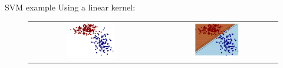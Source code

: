 \begin{frame}{SVM example}
Using a linear kernel:
\begin{figure}
\begin{tabular}{cc}
\includegraphics[width=0.4\textwidth]{img/svm/linear_kernel_11.pdf}&
\includegraphics[width=0.4\textwidth]{img/svm/linear_kernel_12.pdf}
\end{tabular}
\end{figure}
\end{frame}